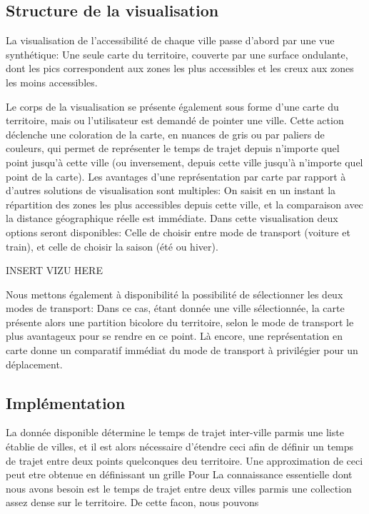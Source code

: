 \documentclass{vgtc}                          %
\begin{document}
\subsection{Structure de la visualisation}

\vspace{0.3cm}

La visualisation de l'accessibilité de chaque ville passe d'abord par une vue synthétique: Une seule carte du territoire, couverte par une surface ondulante, dont les pics correspondent aux zones les plus accessibles et les creux aux zones les moins accessibles. 

Le corps de la visualisation se présente également sous forme d'une carte du territoire, mais ou l'utilisateur est demandé de pointer une ville. Cette action déclenche une coloration de la carte, en nuances de gris ou par paliers de couleurs, qui permet de représenter le temps de trajet depuis n'importe quel point jusqu'à cette ville (ou inversement, depuis cette ville jusqu'à n'importe quel point de la carte). Les avantages d'une représentation par carte par rapport à d'autres solutions de visualisation sont multiples: On saisit en un instant la répartition des zones les plus accessibles depuis cette ville, et la comparaison avec la distance géographique réelle est immédiate. Dans cette visualisation deux options seront disponibles: Celle de choisir entre mode de transport (voiture et train), et celle de choisir la saison (été ou hiver). 

\begin{center}
INSERT VIZU HERE
\end{center}


Nous mettons également à disponibilité la possibilité de sélectionner les deux modes de transport: Dans ce cas, étant donnée une ville sélectionnée, la carte présente alors une partition bicolore du territoire, selon le mode de transport le plus avantageux pour se rendre en ce point. Là encore, une représentation en carte donne un comparatif immédiat du mode de transport à privilégier pour un déplacement.

\subsection{Implémentation}

\vspace{0.3cm}


La donnée disponible détermine le temps de trajet inter-ville parmis une liste établie de villes, et il est alors nécessaire d'étendre ceci afin de définir un temps de trajet entre deux points quelconques deu territoire. Une approximation de ceci peut etre obtenue en définissant un grille  Pour 
La connaissance essentielle dont nous avons besoin est le temps de trajet entre deux villes parmis une collection assez dense sur le territoire. De cette facon, nous pouvons 
\end{document}
